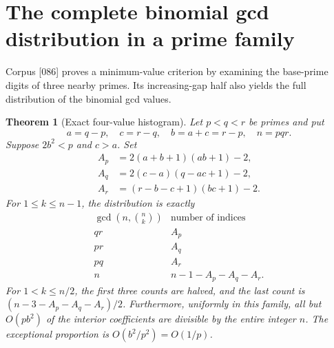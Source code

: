 \documentclass[11pt,a4paper]{article}
\newtheorem{theorem}{Theorem}[section]
\theoremstyle{definition}
\theoremstyle{remark}
\numberwithin{equation}{section}
\begin{document}
\section{The complete binomial gcd distribution in a prime family}
\label{disc:gcdsection}

Corpus [086] proves a minimum-value criterion by examining the base-prime
digits of three nearby primes.  Its increasing-gap half also yields the
full distribution of the binomial gcd values.

\begin{theorem}[Exact four-value histogram]
\label{disc:histogram}
Let $p<q<r$ be primes and put
\[
 a=q-p,\quad c=r-q,\quad b=a+c=r-p,\quad n=pqr.
\]
Suppose $2b^2<p$ and $c>a$.  Set
\begin{align*}
 A_p&=2(a+b+1)(ab+1)-2,\\
 A_q&=2(c-a)(q-ac+1)-2,\\
 A_r&=(r-b-c+1)(bc+1)-2.
\end{align*}
For $1\le k\le n-1$, the distribution is exactly
\[
\begin{array}{c|c}
\gcd(n,\binom nk)&\text{number of indices}\\\hline
qr&A_p\\
pr&A_q\\
pq&A_r\\
n&n-1-A_p-A_q-A_r.
\end{array}
\]
For $1<k\le n/2$, the first three counts are halved, and the last
count is $(n-3-A_p-A_q-A_r)/2$.
Furthermore, uniformly in this family, all but $O(pb^2)$ of the
interior coefficients are divisible by the entire integer $n$.
The exceptional proportion is $O(b^2/p^2)=O(1/p)$.
\end{theorem}
\end{document}
